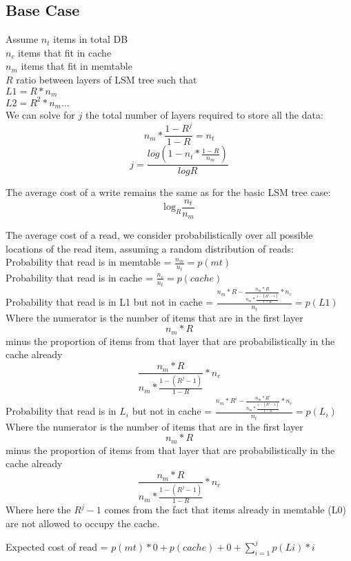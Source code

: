 \documentclass[11pt]{article}
\theoremstyle{plain}
\theoremstyle{definition}
\begin{document}
\subsection{Base Case}

Assume
$n_t$ items in total DB \\
$n_c$ items that fit in cache\\
$n_m$ items that fit in memtable\\
$R$ ratio between layers of LSM tree such that \\
$L1 = R * n_m$ \\
$L2 = R^2 * n_m \dots$ \\ 

We can solve for $j$ the total number of layers required to store all the data: \\
$$n_m * \frac{1-R^j}{1-R} = n_t$$
$$j = \frac{log(1-n_t*\frac{1-R}{n_m})}{log R}$$

The average cost of a write remains the same as for the basic LSM tree case:
$$
\textrm{log}_{R} \frac{n_t}{n_m}
$$

The average cost of a read, we consider probabilistically over all possible locations of the read item, assuming a random distribution of reads: \\
Probability that read is in memtable = $\frac{n_m}{n_t}  = p(mt)$\\
Probability that read is in cache = $\frac{n_c}{n_t} = p(cache)$ \\
Probability that read is in L1 but not in cache = $ \frac{n_m * R - \frac{n_m * R}{n_m * \frac{1-(R^j-1)}{1-R}} * n_c}{n_t}  = p(L1)$\\
Where the numerator is the number of items that are in the first layer $$n_m * R$$ minus the proportion of items from that layer that are probabilistically in the cache already $$\frac{n_m * R}{n_m * \frac{1-(R^j-1)}{1-R}} * n_c$$
Probability that read is in $L_i$ but not in cache = $ \frac{n_m * R^i - \frac{n_m * R^i}{n_m * \frac{1-(R^j-1)}{1-R}} * n_c}{n_t}  = p(L_i)$\\
Where the numerator is the number of items that are in the first layer $$n_m * R$$ minus the proportion of items from that layer that are probabilistically in the cache already $$\frac{n_m * R}{n_m * \frac{1-(R^j-1)}{1-R}} * n_c$$
Where here the $R^j -1$ comes from the fact that items already in memtable (L0) are not allowed to occupy the cache.

Expected cost of read = $p(mt) * 0  + p(cache) + 0 + \sum_{i=1}^j p(Li) * i$
\end{document}
